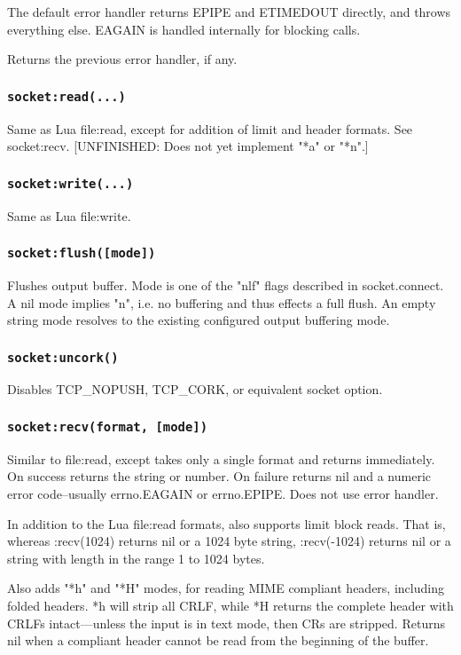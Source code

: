\documentclass[11pt, oneside]{memoir}
\newcommand*{\fn}[1]{\texttt{#1}\xspace}
\begin{document}
	The default error handler returns EPIPE and ETIMEDOUT directly, and
	throws everything else. EAGAIN is handled internally for blocking
	calls.

	Returns the previous error handler, if any.

\subsubsection[\fn{socket:read}]{\fn{socket:read(...)}}
	Same as Lua file:read, except for addition of limit and header
	formats. See socket:recv. [UNFINISHED: Does not yet implement "*a"
	or "*n".]

\subsubsection[\fn{socket:write}]{\fn{socket:write(...)}}
	Same as Lua file:write.

\subsubsection[\fn{socket:flush}]{\fn{socket:flush([mode])}}
	Flushes output buffer. Mode is one of the "nlf" flags described in
	socket.connect. A nil mode implies "n", i.e. no buffering and thus
	effects a full flush. An empty string mode resolves to the existing
	configured output buffering mode.

\subsubsection[\fn{socket:uncork}]{\fn{socket:uncork()}}
	Disables TCP\_NOPUSH, TCP\_CORK, or equivalent socket option.

\subsubsection[\fn{socket:recv}]{\fn{socket:recv(format, [mode])}}
	Similar to file:read, except takes only a single format and returns
	immediately. On success returns the string or number. On failure
	returns nil and a numeric error code--usually errno.EAGAIN or
	errno.EPIPE. Does not use error handler.

	In addition to the Lua file:read formats, also supports limit block
	reads. That is, whereas :recv(1024) returns nil or a 1024 byte
	string, :recv(-1024) returns nil or a string with length in the
	range 1 to 1024 bytes.

	Also adds "*h" and "*H" modes, for reading MIME compliant headers,
	including folded headers. *h will strip all CRLF, while *H returns
	the complete header with CRLFs intact---unless the input is in text
	mode, then CRs are stripped. Returns nil when a compliant header
	cannot be read from the beginning of the buffer.
\end{document}

